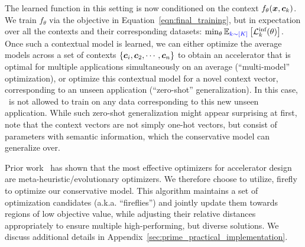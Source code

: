 The learned function in this setting is now conditioned on the context $f_\theta({\boldsymbol{x}}, {\boldsymbol{c}}_k)$. We train $f_\theta$ via the objective in Equation~\ref{eqn:final_training}, but in expectation over all the contexts and their corresponding datasets: $\min_\theta \mathbb{E}_{\textcolor{blue}{k \sim [K]}}\left[\mathcal{L}^\text{inf}_k(\theta)\right]$. Once such a contextual model is learned, we can either optimize the average models across a set of contexts $\{{\boldsymbol{c}}_i, {\boldsymbol{c}}_2, \cdots, {\boldsymbol{c}}_n\}$ to obtain an accelerator that is optimal for multiple applications simultaneously on an average (``multi-model'' optimization), or optimize this contextual model for a novel context vector, corresponding to an unseen application (``zero-shot'' generalization). In this case, \primemethodname\ is not allowed to train on any data corresponding to this new unseen application.  While such zero-shot generalization might appear surprising at first, note that the context vectors are not simply one-hot vectors, but consist of parameters with semantic information, which the conservative model can generalize over.

 Prior work~\citep{yazdanbakhsh2021apollo} has shown that the most effective optimizers for accelerator design are meta-heuristic/evolutionary optimizers. We therefore choose to utilize, firefly~\citep{yang2010nature,yang2010eagle,liu2013adaptive} to optimize our conservative model. This algorithm maintains a set of optimization candidates (a.k.a. ``fireflies'') and jointly update them towards regions of low objective value, while adjusting their relative distances appropriately to ensure multiple high-performing, but diverse solutions. We discuss additional details in Appendix~\ref{sec:prime_practical_implementation}.

